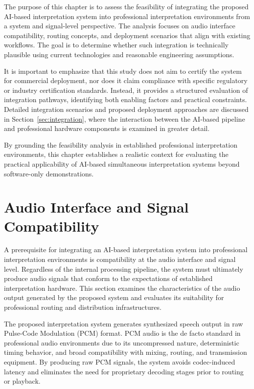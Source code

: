 The purpose of this chapter is to assess the feasibility of integrating the proposed AI-based interpretation system into professional interpretation environments from a system and signal-level perspective. The analysis focuses on audio interface compatibility, routing concepts, and deployment scenarios that align with existing workflows. The goal is to determine whether such integration is technically plausible using current technologies and reasonable engineering assumptions.

It is important to emphasize that this study does not aim to certify the system for commercial deployment, nor does it claim compliance with specific regulatory or industry certification standards. Instead, it provides a structured evaluation of integration pathways, identifying both enabling factors and practical constraints. Detailed integration scenarios and proposed deployment approaches are discussed in Section~\ref{sec:integration}, where the interaction between the AI-based pipeline and professional hardware components is examined in greater detail.

By grounding the feasibility analysis in established professional interpretation environments, this chapter establishes a realistic context for evaluating the practical applicability of AI-based simultaneous interpretation systems beyond software-only demonstrations.


\section{Audio Interface and Signal Compatibility}
\label{sec:audio_compatibility}

A prerequisite for integrating an AI-based interpretation system into professional interpretation environments is compatibility at the audio interface and signal level. Regardless of the internal processing pipeline, the system must ultimately produce audio signals that conform to the expectations of established interpretation hardware. This section examines the characteristics of the audio output generated by the proposed system and evaluates its suitability for professional routing and distribution infrastructures.


The proposed interpretation system generates synthesized speech output in raw Pulse-Code Modulation (PCM) format. PCM audio is the de facto standard in professional audio environments due to its uncompressed nature, deterministic timing behavior, and broad compatibility with mixing, routing, and transmission equipment. By producing raw PCM signals, the system avoids codec-induced latency and eliminates the need for proprietary decoding stages prior to routing or playback.

